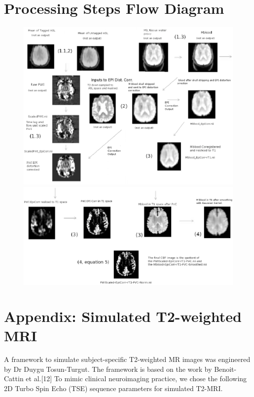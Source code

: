 \documentclass[letterpaper,11pt]{article}
\begin{document}
\pagebreak
\section*{Processing Steps Flow Diagram}
\begin{figure}[H]
\centering\includegraphics[scale = 0.70]{flow_diagram_revised_1.eps}
\centering\includegraphics[scale = 0.65]{flow_diagram_revised_2.eps}
\end{figure}

\section*{Appendix: Simulated T2-weighted MRI}
A framework to simulate subject-specific T2-weighted MR images was engineered by Dr Duygu Tosun-Turgut. The framework is based on the work by Benoit-Cattin et al.[12] To mimic clinical neuroimaging practice, we chose the following 2D Turbo Spin Echo (TSE) sequence parameters for simulated T2-MRI. 
\end{document}
